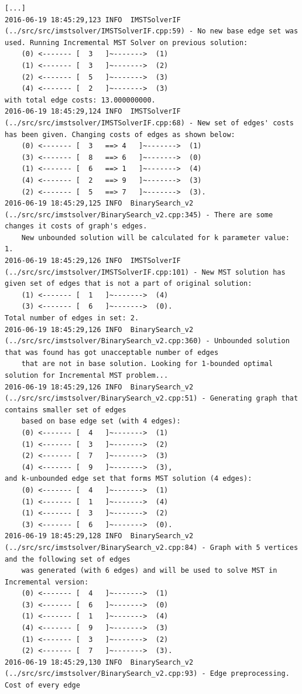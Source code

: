\begin{verbatim}
[...]
2016-06-19 18:45:29,123 INFO  IMSTSolverIF (../src/src/imstsolver/IMSTSolverIF.cpp:59) - No new base edge set was used. Running Incremental MST Solver on previous solution:
	(0)	<------- [	3	]~------->	(1)
	(1)	<------- [	3	]~------->	(2)
	(2)	<------- [	5	]~------->	(3)
	(4)	<------- [	2	]~------->	(3)
with total edge costs: 13.000000000.
2016-06-19 18:45:29,124 INFO  IMSTSolverIF (../src/src/imstsolver/IMSTSolverIF.cpp:68) - New set of edges' costs has been given. Changing costs of edges as shown below:
	(0)	<------- [	3	==>	4	]~------->	(1)
	(3)	<------- [	8	==>	6	]~------->	(0)
	(1)	<------- [	6	==>	1	]~------->	(4)
	(4)	<------- [	2	==>	9	]~------->	(3)
	(2)	<------- [	5	==>	7	]~------->	(3).
2016-06-19 18:45:29,125 INFO  BinarySearch_v2 (../src/src/imstsolver/BinarySearch_v2.cpp:345) - There are some changes it costs of graph's edges. 
	New unbounded solution will be calculated for k parameter value: 1.
2016-06-19 18:45:29,126 INFO  IMSTSolverIF (../src/src/imstsolver/IMSTSolverIF.cpp:101) - New MST solution has given set of edges that is not a part of original solution:
	(1)	<------- [	1	]~------->	(4)
	(3)	<------- [	6	]~------->	(0).
Total number of edges in set: 2.
2016-06-19 18:45:29,126 INFO  BinarySearch_v2 (../src/src/imstsolver/BinarySearch_v2.cpp:360) - Unbounded solution that was found has got unacceptable number of edges 
	that are not in base solution. Looking for 1-bounded optimal solution for Incremental MST problem...
2016-06-19 18:45:29,126 INFO  BinarySearch_v2 (../src/src/imstsolver/BinarySearch_v2.cpp:51) - Generating graph that contains smaller set of edges 
	based on base edge set (with 4 edges):
	(0)	<------- [	4	]~------->	(1)
	(1)	<------- [	3	]~------->	(2)
	(2)	<------- [	7	]~------->	(3)
	(4)	<------- [	9	]~------->	(3),
and k-unbounded edge set that forms MST solution (4 edges):
	(0)	<------- [	4	]~------->	(1)
	(1)	<------- [	1	]~------->	(4)
	(1)	<------- [	3	]~------->	(2)
	(3)	<------- [	6	]~------->	(0).
2016-06-19 18:45:29,128 INFO  BinarySearch_v2 (../src/src/imstsolver/BinarySearch_v2.cpp:84) - Graph with 5 vertices and the following set of edges 
	was generated (with 6 edges) and will be used to solve MST in Incremental version:
	(0)	<------- [	4	]~------->	(1)
	(3)	<------- [	6	]~------->	(0)
	(1)	<------- [	1	]~------->	(4)
	(4)	<------- [	9	]~------->	(3)
	(1)	<------- [	3	]~------->	(2)
	(2)	<------- [	7	]~------->	(3).
2016-06-19 18:45:29,130 INFO  BinarySearch_v2 (../src/src/imstsolver/BinarySearch_v2.cpp:93) - Edge preprocessing. Cost of every edge 

\end{verbatim}
